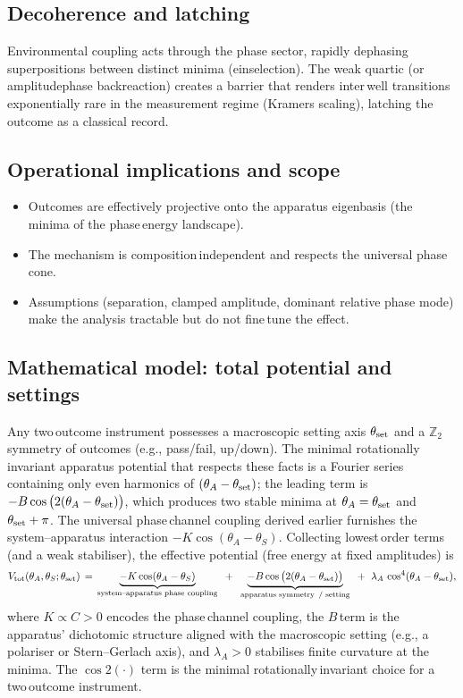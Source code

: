 \documentclass[11pt]{article}
\begin{document}
\subsection{Decoherence and latching}
Environmental coupling acts through the phase sector, rapidly dephasing superpositions between distinct minima (einselection). The weak quartic (or amplitude\textendash phase backreaction) creates a barrier that renders inter\,well transitions exponentially rare in the measurement regime (Kramers scaling), latching the outcome as a classical record.

\subsection{Operational implications and scope}
\begin{itemize}
\item Outcomes are effectively projective onto the apparatus eigenbasis (the minima of the phase\,energy landscape).
\item The mechanism is composition\,independent and respects the universal phase cone.
\item Assumptions (separation, clamped amplitude, dominant relative phase mode) make the analysis tractable but do not fine\,tune the effect.
\end{itemize}

\subsection{Mathematical model: total potential and settings}
Any two\,outcome instrument possesses a macroscopic setting axis $\theta_{\rm set}$ and a $\mathbb Z_2$ symmetry of outcomes (e.g., pass/fail, up/down). The minimal rotationally\,invariant apparatus potential that respects these facts is a Fourier series containing only even harmonics of $(\theta_A-\theta_{\rm set})$; the leading term is $-B\cos\big(2(\theta_A-\theta_{\rm set})\big)$, which produces two stable minima at $\theta_A=\theta_{\rm set}$ and $\theta_{\rm set}+\pi$. The universal phase\,channel coupling derived earlier furnishes the system–apparatus interaction $-K\cos(\theta_A-\theta_S)$. Collecting lowest\,order terms (and a weak stabiliser), the effective potential (free energy at fixed amplitudes) is
\begin{equation}
  V_{\rm tot}(\theta_A,\theta_S;\theta_{\rm set}) \,=\, \underbrace{-K\cos(\theta_A-\theta_S)}_{\text{system–apparatus phase coupling}} \;\; +\;\; \underbrace{-B\cos\big(2(\theta_A-\theta_{\rm set})\big)}_{\text{apparatus symmetry \,/ setting}} \;\; +\;\; \lambda_A\,\cos^4(\theta_A-\theta_{\rm set}),
  \label{eq:VtotalSA}
\end{equation}
where $K\propto C>0$ encodes the phase\,channel coupling, the $B$\,term is the apparatus' dichotomic structure aligned with the macroscopic setting (e.g., a polariser or Stern–Gerlach axis), and $\lambda_A>0$ stabilises finite curvature at the minima. The $\cos 2(\cdot)$ term is the minimal rotationally\,invariant choice for a two\,outcome instrument.
\end{document}
